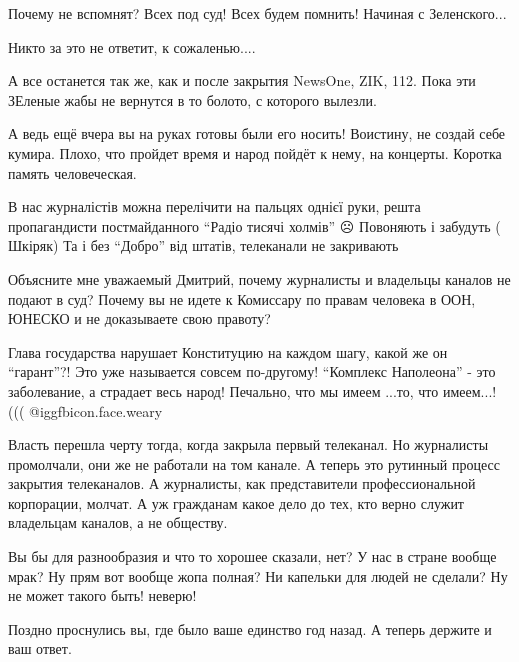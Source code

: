 \begin{itemize}
Почему не вспомнят? Всех под суд! Всех будем помнить! Начиная с Зеленского...

Никто за это не ответит, к сожаленью....


А все останется так же, как и после закрытия NewsOne, ZIK, 112. Пока эти
ЗЕленые жабы не вернутся в то болото, с которого вылезли.


А ведь ещё вчера вы на руках готовы были его носить! Воистину, не создай себе
кумира. Плохо, что пройдет время и народ пойдёт к нему, на концерты. Коротка
память человеческая.


В нас журналістів можна перелічити на пальцях однієї руки, решта пропагандисти
постмайданного \enquote{Радіо тисячі холмів} ☹️ Повоняють і забудуть ( Шкіряк) Та і без
\enquote{Добро} від штатів, телеканали не закривають


Объясните мне уважаемый Дмитрий, почему журналисты и владельцы каналов не
подают в суд? Почему вы не идете к Комиссару по правам человека в ООН, ЮНЕСКО и
не доказываете свою правоту?


Глава государства нарушает Конституцию на каждом шагу, какой же он \enquote{гарант}?!
Это уже называется совсем по-другому! \enquote{Комплекс Наполеона} - это заболевание, а
страдает весь народ! Печально, что мы имеем ...то, что имеем...! (((  @igg{fbicon.face.weary} 


Власть перешла черту тогда, когда закрыла первый телеканал. Но журналисты
промолчали, они же не работали на том канале. А теперь это рутинный процесс
закрытия телеканалов. А журналисты, как представители профессиональной
корпорации, молчат. А уж гражданам какое дело до тех, кто верно служит
владельцам каналов, а не обществу.


Вы бы для разнообразия и что то хорошее сказали, нет? У нас в стране вообще
мрак? Ну прям вот вообще жопа полная? Ни капельки для людей не сделали? Ну не
может такого быть! неверю!

Поздно проснулись вы, где было ваше единство год назад. А теперь держите и ваш ответ.


\end{itemize}
